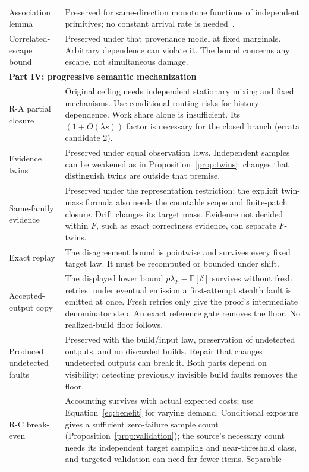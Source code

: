 \documentclass[11pt]{article}
\theoremstyle{definition}
\theoremstyle{remark}
\newcommand{\E}{\mathbb E}
\begin{document}
\begin{longtable}{p{}p{}}
Association lemma & Preserved for same-direction monotone functions of independent primitives;
no constant arrival rate is needed~\cite{epw}.\\
Correlated-escape bound & Preserved under that provenance model at fixed marginals. Arbitrary
dependence can violate it. The bound concerns any escape, not simultaneous damage.\\
\midrule
\multicolumn{2}{l}{\textbf{Part IV: progressive semantic mechanization}}\\
R-A partial closure & Original ceiling needs independent stationary mixing and fixed mechanisms.
Use conditional routing risks for history dependence. Work share alone is insufficient.
Its $(1+O(\lambda s))$ factor is necessary for the closed branch (errata candidate 2).\\
Evidence twins & Preserved under equal observation laws. Independent samples can be weakened
as in Proposition~\ref{prop:twins}; changes that distinguish twins are outside that premise.\\
Same-family evidence & Preserved under the representation restriction; the explicit twin-mass
formula also needs the countable scope and finite-patch closure. Drift changes its target mass.
Evidence not decided within $F$, such as exact correctness evidence, can separate $F$-twins.\\
Exact replay & The disagreement bound is pointwise and survives every fixed target law.
It must be recomputed or bounded under shift.\\
Accepted-output copy & The displayed lower bound $p\lambda_F-\E[\delta]$ survives without fresh
retries: under eventual emission a first-attempt stealth fault is emitted at once. Fresh retries
only give the proof's intermediate denominator step. An exact reference gate removes the floor.
No realized-build floor follows.\\
Produced undetected faults & Preserved with the build/input law, preservation of undetected
outputs, and no discarded builds. Repair that changes undetected outputs can break it. Both
parts depend on visibility: detecting previously invisible build faults removes the floor.\\
R-C break-even & Accounting survives with actual expected costs; use Equation~\eqref{eq:benefit}
for varying demand. Conditional exposure gives a sufficient zero-failure sample count
(Proposition~\ref{prop:validation}); the source's necessary count needs its independent target
sampling and near-threshold class, and targeted validation can need far fewer items. Separable

\end{longtable}
\end{document}
